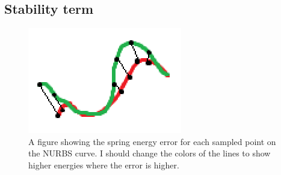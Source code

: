 \subsection{Stability term}
\begin{figure}[h]
  \centering
  \includegraphics[width=\linewidth]{figures/error_energy}
  \caption{A figure showing the spring energy error for each sampled point on the NURBS curve. I should change the colors of the lines to show higher energies where the error is higher.}
\end{figure}


